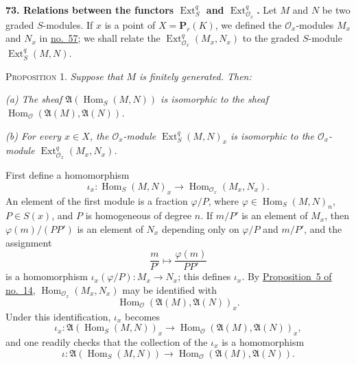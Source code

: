 
\medskip
{}\label{fac:III:5}
\label{fac:III:5:no:73}
\textbf{73. Relations between the functors
$\operatorname{Ext}_S^q$ and $\operatorname{Ext}_{\mathcal O_x}^q$.}
Let $M$ and $N$ be two graded $S$-modules. If $x$ is a point of
$X=\mathbf P_r(K)$, we defined the $\mathcal O_x$-modules $M_x$ and
$N_x$ in \hyperref[fac:III:2:no:57]{no.~57}; we shall relate the
$\operatorname{Ext}_{\mathcal O_x}^q(M_x,N_x)$ to the graded
$S$-module $\operatorname{Ext}_S^q(M,N)$.

\label{fac:III:5:no:73:prop:1}
\textsc{Proposition 1.} \textit{Suppose that $M$ is finitely generated.
Then:}

\label{fac:III:5:no:73:prop:1:a}
\textit{(a) The sheaf
$\mathfrak A(\operatorname{Hom}_S(M,N))$ is isomorphic to the sheaf
$\operatorname{Hom}_{\mathcal O}(\mathfrak A(M),\mathfrak A(N))$.}

\label{fac:III:5:no:73:prop:1:b}
\textit{(b) For every $x\in X$, the $\mathcal O_x$-module
$\operatorname{Ext}_S^q(M,N)_x$ is isomorphic to the
$\mathcal O_x$-module
$\operatorname{Ext}_{\mathcal O_x}^q(M_x,N_x)$.}

First define a homomorphism
\label{fac:III:5:no:73:map:iota-x}
\[
\iota_x:\operatorname{Hom}_S(M,N)_x
\longrightarrow\operatorname{Hom}_{\mathcal O_x}(M_x,N_x).
\]
An element of the first module is a fraction $\varphi/P$, where
$\varphi\in\operatorname{Hom}_S(M,N)_n$, $P\in S(x)$, and $P$ is
homogeneous of degree $n$. If $m/P'$ is an element of $M_x$, then
$\varphi(m)/(PP')$ is an element of $N_x$ depending only on
$\varphi/P$ and $m/P'$, and the assignment
\[
\frac{m}{P'}\longmapsto\frac{\varphi(m)}{PP'}
\]
is a homomorphism
$\iota_x(\varphi/P):M_x\longrightarrow N_x$; this defines $\iota_x$.
By \hyperref[fac:I:2:no:14:prop:5]{Proposition~5 of no.~14},
$\operatorname{Hom}_{\mathcal O_x}(M_x,N_x)$ may be identified with
\label{fac:III:5:no:73:formula:Hom-stalk}
\[
\operatorname{Hom}_{\mathcal O}(\mathfrak A(M),\mathfrak A(N))_x.
\]
Under this identification, $\iota_x$ becomes
\[
\iota_x:\mathfrak A(\operatorname{Hom}_S(M,N))_x
\longrightarrow
\operatorname{Hom}_{\mathcal O}(\mathfrak A(M),\mathfrak A(N))_x,
\]
and one readily checks that the collection of the $\iota_x$ is a
homomorphism
\label{fac:III:5:no:73:map:iota}
\[
\iota:\mathfrak A(\operatorname{Hom}_S(M,N))
\longrightarrow
\operatorname{Hom}_{\mathcal O}(\mathfrak A(M),\mathfrak A(N)).
\]

